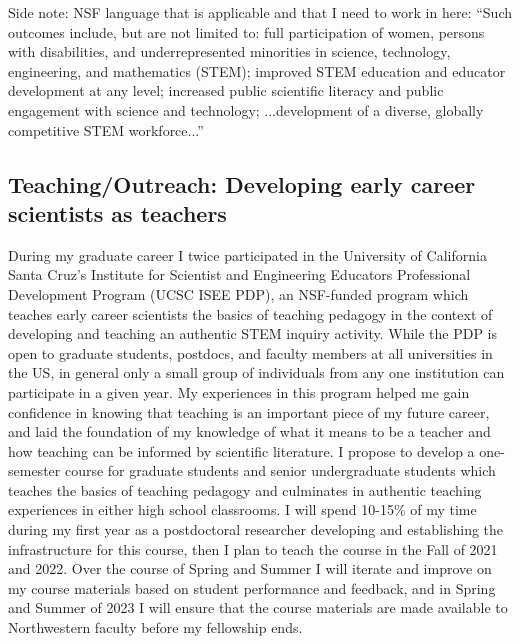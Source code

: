 \documentclass[aasms,12pt]{article}
\begin{document}
Side note: NSF language that is applicable and that I need to work in here: ``Such outcomes include, but are not limited to: full participation of women, persons with disabilities, and underrepresented minorities in science, technology, engineering, and mathematics (STEM); improved STEM education and educator development at any level; increased public scientific literacy and public engagement with science and technology; ...development of a diverse, globally competitive STEM workforce...''



\subsection{Teaching/Outreach: Developing early career scientists as teachers}
During my graduate career I twice participated in the University of California Santa Cruz's Institute for Scientist and Engineering Educators Professional Development Program (UCSC ISEE PDP), an NSF-funded program which teaches early career scientists the basics of teaching pedagogy in the context of developing and teaching an authentic STEM inquiry activity.
While the PDP is open to graduate students, postdocs, and faculty members at all universities in the US, in general only a small group of individuals from any one institution can participate in a given year.
My experiences in this program helped me gain confidence in knowing that teaching is an important piece of my future career, and laid the foundation of my knowledge of what it means to be a teacher and how teaching can be informed by scientific literature.
I propose to develop a one-semester course for graduate students and senior undergraduate students which teaches the basics of teaching pedagogy and culminates in authentic teaching experiences in either high school classrooms.
I will spend 10-15\% of my time during my first year as a postdoctoral researcher developing and establishing the infrastructure for this course, then I plan to teach the course in the Fall of 2021 and 2022.
Over the course of Spring and Summer I will iterate and improve on my course materials based on student performance and feedback, and in Spring and Summer of 2023 I will ensure that the course materials are made available to Northwestern faculty before my fellowship ends.
\end{document}
